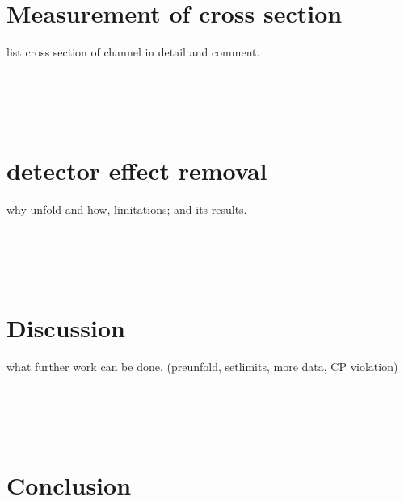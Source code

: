 \documentclass[12pt, twoside, notitlepage, twocolumn]{article}
\begin{document}
        \section{Measurement of cross section}
            list cross section of channel in detail and comment. \\ \\ \\ \\ \\ 
        \section{detector effect removal}
            why unfold and how, limitations; and its results.  \\ \\ \\ \\ \\ 
        \section{Discussion}
            what further work can be done. (preunfold, setlimits, more data, CP violation) \\ \\ \\ \\ \\ 
        \section{Conclusion}
            
        
        
    
\end{document}
